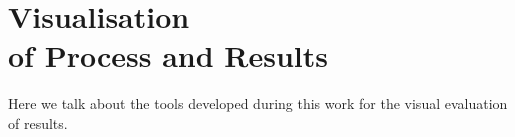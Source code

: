 \chapter{Visualisation \\ of Process and Results}
Here we talk about the tools developed during this work for the visual evaluation of results.